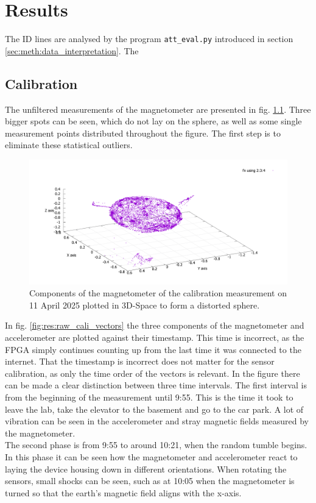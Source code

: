 \chapter{Results \label{ch:results}}
The ID lines are analysed by the program \verb|att_eval.py| introduced in section \ref{sec:meth:data_interpretation}. The

\section{Calibration \label{sec:res:calibration}}
The unfiltered measurements of the magnetometer are presented in fig. \ref{fig:res:raw_cali}. Three bigger spots can be seen, which do not lay on the sphere, as well as some single measurement points distributed throughout the figure. The first step is to eliminate these statistical outliers.

\begin{figure}[H]
    \centering
    \includegraphics[width=0.8\linewidth]{images/04_results/raw_sphere_2025-04-11.pdf}
    \caption{Components of the magnetometer of the calibration measurement on 11 April 2025 plotted in 3D-Space to form a distorted sphere.}
    \label{fig:res:raw_cali}
\end{figure}

In fig. \ref{fig:res:raw_cali_vectors} the three components of the magnetometer and accelerometer are plotted against their timestamp. This time is incorrect, as the \ac{FPGA} simply continues counting up from the last time it was connected to the internet. That the timestamp is incorrect does not matter for the sensor calibration, as only the time order of the vectors is relevant. In the figure there can be made a clear distinction between three time intervals. The first interval is from the beginning of the measurement until 9:55. This is the time it took to leave the lab, take the elevator to the basement and go to the car park. A lot of vibration can be seen in the accelerometer and stray magnetic fields measured by the magnetometer.\\
The second phase is from 9:55 to around 10:21, when the random tumble begins. In this phase it can be seen how the magnetometer and accelerometer react to laying the device housing down in different orientations. When rotating the sensors, small shocks can be seen, such as at 10:05 when the magnetometer is turned so that the earth's magnetic field aligns with the x-axis.


